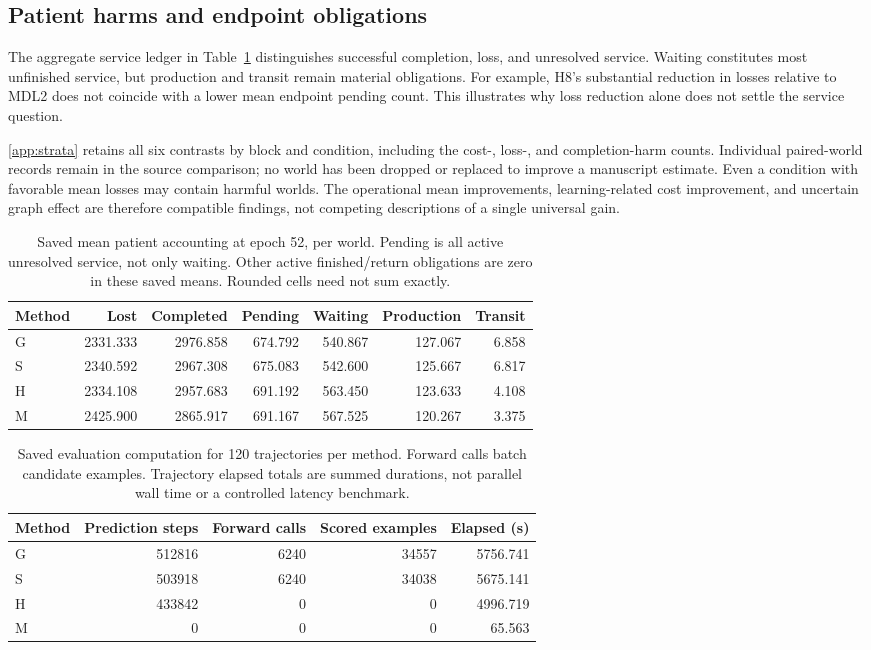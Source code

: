 \documentclass[preprint,12pt]{elsarticle}
\begin{document}
\subsection{Patient harms and endpoint obligations}
The aggregate service ledger in Table~\ref{tab:endpoint} distinguishes successful
completion, loss, and unresolved service. Waiting constitutes most unfinished
service, but production and transit remain material obligations. For example,
H8's substantial reduction in losses relative to MDL2 does not coincide with a
lower mean endpoint pending count. This illustrates why loss reduction alone
does not settle the service question.

\ref{app:strata} retains all six contrasts by block and condition,
including the cost-, loss-, and completion-harm counts. Individual paired-world
records remain in the source comparison; no world has been dropped or replaced
to improve a manuscript estimate. Even a condition with favorable mean losses
may contain harmful worlds. The operational mean improvements, learning-related
cost improvement, and uncertain graph effect are therefore compatible findings,
not competing descriptions of a single universal gain.

\begin{table}[t]
\centering
\caption{Saved mean patient accounting at epoch 52, per world. Pending is all
active unresolved service, not only waiting. Other active finished/return
obligations are zero in these saved means. Rounded cells need not sum exactly.}
\label{tab:endpoint}
\small
\setlength{\tabcolsep}{4pt}
\begin{tabular}{lrrrrrr}
\toprule
Method & Lost & Completed & Pending & Waiting & Production & Transit\\
\midrule
G & 2331.333 & 2976.858 & 674.792 & 540.867 & 127.067 & 6.858\\
S & 2340.592 & 2967.308 & 675.083 & 542.600 & 125.667 & 6.817\\
H & 2334.108 & 2957.683 & 691.192 & 563.450 & 123.633 & 4.108\\
M & 2425.900 & 2865.917 & 691.167 & 567.525 & 120.267 & 3.375\\
\bottomrule
\end{tabular}
\end{table}

\begin{table}[t]
\centering
\caption{Saved evaluation computation for 120 trajectories per method.
Forward calls batch candidate examples. Trajectory elapsed totals are summed
durations, not parallel wall time or a controlled latency benchmark.}
\label{tab:compute}
\small
\begin{tabular}{lrrrr}
\toprule
Method & Prediction steps & Forward calls & Scored examples & Elapsed (s)\\
\midrule
G & 512816 & 6240 & 34557 & 5756.741\\
S & 503918 & 6240 & 34038 & 5675.141\\
H & 433842 & 0 & 0 & 4996.719\\
M & 0 & 0 & 0 & 65.563\\
\bottomrule
\end{tabular}
\end{table}
\end{document}
